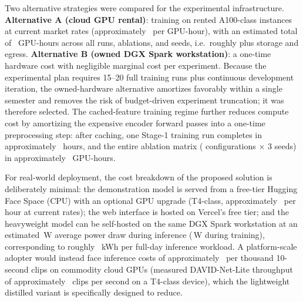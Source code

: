 Two alternative strategies were compared for the experimental infrastructure.
\textbf{Alternative A (cloud GPU rental)}: training on rented A100-class
instances at current market rates (approximately
~per GPU-hour), with an estimated total of
~GPU-hours across all runs, ablations, and seeds, i.e.\ roughly
 plus storage and egress. \textbf{Alternative B
(owned DGX Spark workstation)}: a one-time hardware cost with negligible
marginal cost per experiment. Because the experimental plan requires 15--20
full training runs plus continuous development iteration, the owned-hardware
alternative amortizes favorably within a single semester and removes the risk
of budget-driven experiment truncation; it was therefore selected. The
cached-feature training regime further reduces compute cost by amortizing the
expensive encoder forward passes into a one-time preprocessing step: after
caching, one Stage-1 training run completes in approximately
~hours, and the entire ablation matrix ( configurations
$\times$ 3 seeds) in approximately ~GPU-hours.

For real-world deployment, the cost breakdown of the proposed solution is
deliberately minimal: the demonstration model is served from a free-tier
Hugging Face Space (CPU) with an optional GPU upgrade (T4-class, approximately
~per hour at current rates); the web interface is hosted on
Vercel's free tier; and the heavyweight model can be self-hosted on the same
DGX Spark workstation at an estimated \,W average power draw
during inference (\,W during training), corresponding to roughly
~kWh per full-day inference workload. A platform-scale adopter
would instead face inference costs of approximately
~per thousand 10-second clips on commodity cloud GPUs
(measured DAVID-Net-Lite throughput of approximately ~clips per
second on a T4-class device), which the lightweight distilled variant is
specifically designed to reduce.
